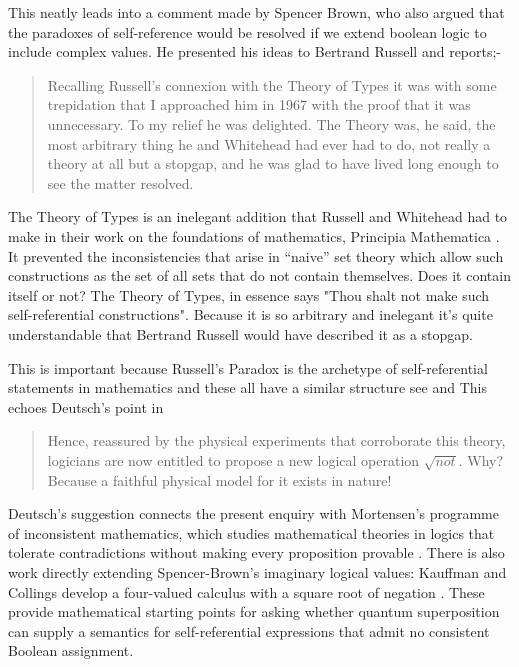 This neatly leads into a comment made by Spencer Brown, who also argued that the paradoxes of
self-reference would be resolved if we extend boolean logic to include complex values. He
presented his ideas to Bertrand Russell and reports;-
\begin{quotation}
Recalling Russell's connexion with the Theory of Types it was with some trepidation that I
approached him in 1967 with the proof that it was unnecessary. To my relief he was delighted.
The Theory was, he said, the most arbitrary thing he and Whitehead had ever had to do, not
really a theory at all but a stopgap, and he was glad to have lived long enough to see the
matter resolved. \hfill \autocite[ix]{Spence-Brown-1969}
\end{quotation}
The Theory of Types is an inelegant addition that Russell and Whitehead had to make in their
work on the foundations of mathematics, Principia Mathematica \autocite{russell_2010}. It
prevented the inconsistencies that arise in \enquote{naive} set theory which allow such
constructions as the set of all sets that do not contain themselves. Does it contain itself or
not? The Theory of Types, in essence says "Thou shalt not make such self-referential
constructions". Because it is so arbitrary and inelegant it's quite understandable that Bertrand
Russell would have described it as a stopgap.

This is important because Russell's Paradox is the archetype of self-referential statements in
mathematics and these all have a similar structure see \autocite{Lawvere_1969} and
\autocite{Yanofsky2003} This echoes Deutsch's point in \autocite{deutsch_1999}
\begin{quotation}
Hence, reassured by the physical experiments that corroborate this theory, logicians are now
entitled to propose a new logical operation $\sqrt{not}$. Why? Because a faithful physical model
for it exists in nature!
\end{quotation}
Deutsch's suggestion connects the present enquiry with Mortensen's programme of inconsistent
mathematics, which studies mathematical theories in logics that tolerate contradictions without
making every proposition provable \autocite{mortensen1995inconsistent}. There is also work directly
extending Spencer-Brown's imaginary logical values: Kauffman and Collings develop a four-valued
calculus with a square root of negation \autocite{kauffmancollings2019bf}. These provide
mathematical starting points for asking whether quantum superposition can supply a semantics for
self-referential expressions that admit no consistent Boolean assignment.

